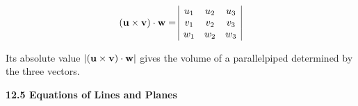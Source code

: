 \begin{itemize}
    \[
    (\mathbf{u}\times\mathbf{v})\cdot\mathbf{w} =
    \begin{array}{|c c c|}
    u_1 & u_2 & u_3 \\
    v_1 & v_2 & v_3 \\
    w_1 & w_2 & w_3 \\
    \end{array}
    \]
    
    Its absolute value $|(\mathbf{u}\times\mathbf{v})\cdot\mathbf{w}|$ gives the volume of a parallelpiped determined by the three vectors.
    
    \end{itemize}

\newpage

\centerline{\bf 12.5 Equations of Lines and Planes}
  
